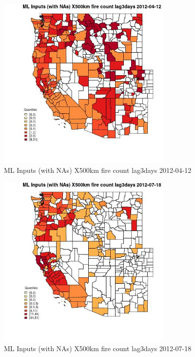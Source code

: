 \begin{figure} 
\centering  
\includegraphics[width=0.77\textwidth]{Code_Outputs/Report_ML_input_PM25_Step4_part_e_de_duplicated_aves_compiled_2019-05-14wNAs_CountyX500km_fire_count_lag3daysMean2012-04-12_2012-04-12.jpg} 
\caption{\label{fig:Report_ML_input_PM25_Step4_part_e_de_duplicated_aves_compiled_2019-05-14wNAsCountyX500km_fire_count_lag3daysMean2012-04-12_2012-04-12}ML Inputs (with NAs) X500km fire count lag3days 2012-04-12} 
\end{figure} 
 

\begin{figure} 
\centering  
\includegraphics[width=0.77\textwidth]{Code_Outputs/Report_ML_input_PM25_Step4_part_e_de_duplicated_aves_compiled_2019-05-14wNAs_CountyX500km_fire_count_lag3daysMean2012-07-18_2012-07-18.jpg} 
\caption{\label{fig:Report_ML_input_PM25_Step4_part_e_de_duplicated_aves_compiled_2019-05-14wNAsCountyX500km_fire_count_lag3daysMean2012-07-18_2012-07-18}ML Inputs (with NAs) X500km fire count lag3days 2012-07-18} 
\end{figure} 
 

